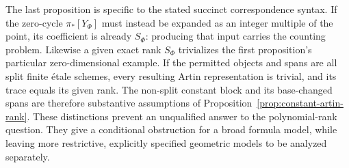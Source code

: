 The last proposition is specific to the stated succinct
correspondence syntax.  If the zero-cycle $\pi_*[Y_\Phi]$ must
instead be expanded as an integer multiple of the point, its
coefficient is already $S_\Phi$: producing that input carries
the counting problem.  Likewise a given exact rank
$S_\Phi$ trivializes the first proposition's particular
zero-dimensional example.  If the permitted objects and spans
are all split finite \'etale schemes, every resulting Artin
representation is trivial, and its trace equals its given
rank.  The non-split constant block and its base-changed spans
are therefore substantive assumptions of
Proposition~\ref{prop:constant-artin-rank}.
These distinctions prevent an
unqualified answer to the polynomial-rank question.  They
give a conditional obstruction for a broad formula model,
while leaving more restrictive, explicitly specified geometric
models to be analyzed separately.


